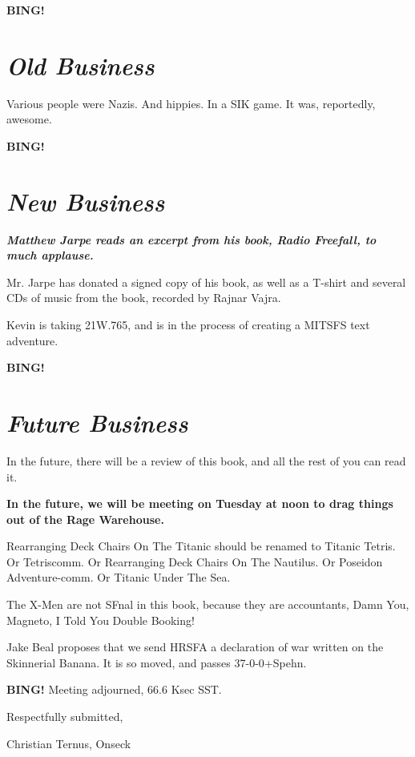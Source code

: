 \documentclass[10pt]{article}
\newcommand{\bing}{{\bf BING!} }
\newcommand{\goto}[1]{\bing \vskip 12pt \section*{{\em{#1}}}}
\begin{document}



\goto{Old Business}

Various people were Nazis.  And hippies.  In a SIK game.  It was, reportedly, awesome.

\goto{New Business}

\textbf{\emph{Matthew Jarpe reads an excerpt from his book, Radio Freefall, to much applause.}}

Mr. Jarpe has donated a signed copy of his book, as well as a T-shirt and several CDs of music from the book, recorded by Rajnar Vajra.

Kevin is taking 21W.765, and is in the process of creating a MITSFS text adventure.

\goto{Future Business}

In the future, there will be a review of this book, and all the rest of you can read it.

\textbf{In the future, we will be meeting on Tuesday at noon to drag things out of the Rage Warehouse.}

Rearranging Deck Chairs On The Titanic should be renamed to Titanic Tetris.  Or Tetriscomm.  Or Rearranging Deck Chairs 
On The Nautilus.  Or Poseidon Adventure-comm.  Or Titanic Under The Sea.

The X-Men are not SFnal in this book, because they are accountants, Damn You, Magneto, I Told You Double Booking!

Jake Beal proposes that we send HRSFA a declaration of war written on the Skinnerial Banana.  It is so moved, and passes 37-0-0+Spehn. 

\bing
\noindent
Meeting adjourned, 66.6 Ksec SST.

\vspace{18pt}

\centerline{Respectfully submitted,}
\centerline{Christian Ternus, Onseck}
\end{document}
